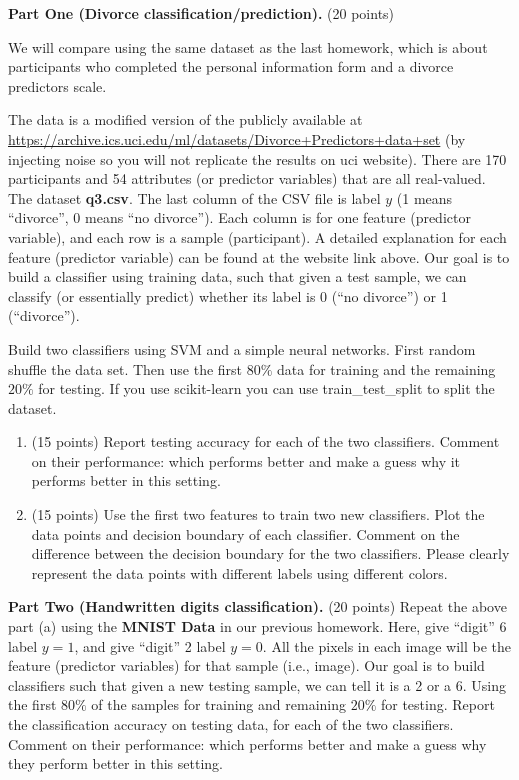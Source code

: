 \documentclass[twoside,10pt]{article}
\begin{document}
\begin{enumerate}
\textbf{Part One (Divorce classification/prediction).} (20 points) 

We will compare using the same dataset as the last homework, which is about participants who completed the personal information form and a divorce predictors scale. 

The data is a modified version of the publicly available at \url{https://archive.ics.uci.edu/ml/datasets/Divorce+Predictors+data+set} (by injecting noise so you will not replicate the results on uci website). There are 170 participants and 54 attributes (or predictor variables) that are all real-valued. The dataset \textbf{q3.csv}. The last column of the CSV file is label $y$ (1 means ``divorce'', 0 means ``no divorce''). Each column is for one feature (predictor variable), and each row is a sample (participant). A detailed explanation for each feature (predictor variable) can be found at the website link above. Our goal is to build a classifier using training data, such that given a test sample, we can classify (or essentially predict) whether its label is 0 (``no divorce'') or 1 (``divorce''). 

Build two classifiers using SVM and a simple neural networks. First random shuffle the data set. Then use the first $80\%$ data for training and the remaining $20\%$ for testing. If you use \textsf{scikit-learn} you can use \textsf{train\_test\_split} to split the dataset. 

\begin{enumerate}

	\item (15 points) Report testing accuracy for each of the two classifiers.  Comment on their performance: which performs better and make a guess why it performs better in this setting. 
	\item (15 points) Use the first two features to train two new classifiers. Plot the data points and decision boundary of each classifier. Comment on the difference between the decision boundary for the two classifiers. Please clearly represent the data points with different labels using different colors.
\end{enumerate}

\textbf{Part Two (Handwritten digits classification).} (20 points) Repeat the above part (a) using the \textbf{MNIST Data} in our previous homework. Here, give ``digit'' 6 label $y = 1$, and give ``digit'' 2 label $y = 0$. All the pixels in each image will be the feature (predictor variables) for that sample (i.e., image). Our goal is to build classifiers such that given a new testing sample, we can tell it is a 2 or a 6. Using the first $80\%$ of the samples for training and remaining $20\%$ for testing. Report the classification accuracy on testing data, for each of the two classifiers. Comment on their performance: which performs better and make a guess why they perform better in this setting. 


\end{enumerate}
\end{document}
